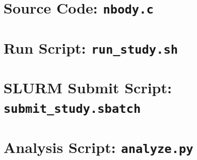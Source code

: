 \documentclass[11pt]{article}
\begin{document}
\newpage
\appendix

\section{Source Code: \texttt{nbody.c}}


\newpage
\section{Run Script: \texttt{run\_study.sh}}


\newpage
\section{SLURM Submit Script: \texttt{submit\_study.sbatch}}


\newpage
\section{Analysis Script: \texttt{analyze.py}}

\end{document}
